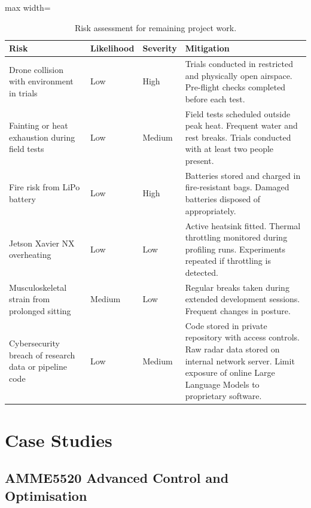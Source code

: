 \begin{adjustbox}{max width=\linewidth}
\end{adjustbox}
\begin{table}[H]
    \centering
    \caption{Risk assessment for remaining project work.}
    \begin{tabular}{p{}|p{}|p{}|p{}}
        \hline
        \textbf{Risk} & \textbf{Likelihood} & \textbf{Severity} & \textbf{Mitigation} \\
        \hline
        Drone collision with environment in trials & Low & High & Trials conducted 
        in restricted and physically open airspace. Pre-flight checks completed 
        before each test. \\
        Fainting or heat exhaustion during field tests & Low & Medium & Field 
        tests scheduled outside peak heat. Frequent water and rest breaks. 
        Trials conducted with at least two people present. \\
        Fire risk from LiPo battery & Low & High & Batteries stored and charged 
        in fire-resistant bags. Damaged batteries disposed of appropriately. \\
        Jetson Xavier NX overheating & Low & Low & Active heatsink fitted. 
        Thermal throttling monitored during profiling runs. Experiments 
        repeated if throttling is detected. \\
        Musculoskeletal strain from prolonged sitting & Medium & Low & Regular 
        breaks taken during extended development sessions. Frequent changes in 
        posture. \\
        Cybersecurity breach of research data or pipeline code & Low & Medium & 
        Code stored in private repository with access controls. Raw radar data 
        stored on internal network server. Limit exposure of online Large Language
        Models to proprietary software. \\
    \end{tabular}
    \label{tab:risk_management}
\end{table}
\section{Case Studies}
\subsection{AMME5520 Advanced Control and Optimisation}

